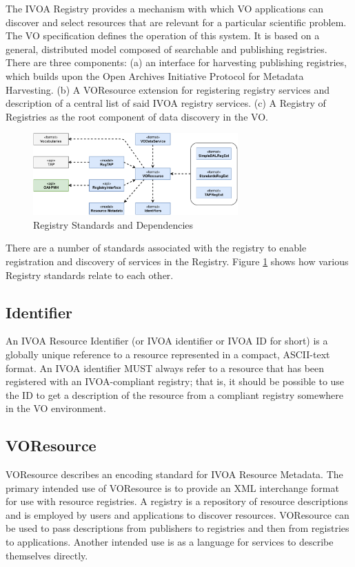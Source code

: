 \documentclass[11pt,a4paper]{ivoa}
\begin{document}
The IVOA Registry provides a mechanism with which VO applications can discover and select 
resources that are relevant for a particular scientific problem. The VO specification defines 
the operation of this system. It is based on a general, distributed model composed of searchable 
and publishing registries. There are three components: (a) an interface for harvesting publishing 
registries, which builds upon the Open Archives Initiative Protocol for Metadata Harvesting. 
(b) A VOResource extension for registering registry services and description of a central list 
of said IVOA registry services. (c) A Registry of Registries as the root component of data discovery 
in the VO. 

\begin{figure}[h]
\centering
\includegraphics[width=0.70\textwidth]{ivoa-arch-registry.pdf}
\caption{Registry Standards and Dependencies}
\label{fig:regdeps}
\end{figure}

There are a number of standards associated with the registry to enable registration and discovery 
of services in the Registry.  Figure \ref{fig:regdeps} shows how various Registry standards relate to each other.

\subsection{Identifier}

An IVOA Resource Identifier (or IVOA identifier or IVOA ID for short) is a globally unique reference 
to a resource represented in a compact, ASCII-text format.  An IVOA identifier MUST always refer to 
a resource that has been registered with an IVOA-compliant registry; that is, it should be possible 
to use the ID to get a description of the resource from a compliant registry somewhere in the VO 
environment.

\subsection{VOResource}

VOResource describes an encoding standard for IVOA Resource Metadata. The primary intended use of 
VOResource is to provide an XML interchange format for use with resource registries. A registry is 
a repository of resource descriptions and is employed by users and applications to discover resources. 
VOResource can be used to pass descriptions from publishers to registries and then from registries to 
applications. Another intended use is as a language for services to describe themselves directly.
\end{document}
